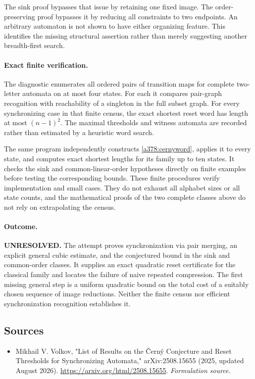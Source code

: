 \documentclass[11pt]{article}
\begin{document}
The sink proof bypasses that issue by retaining one fixed image. The order-preserving proof bypasses it by reducing all constraints to two endpoints. An arbitrary automaton is not shown to have either organizing feature. This identifies the missing structural assertion rather than merely suggesting another breadth-first search.

\paragraph{Exact finite verification.}
The diagnostic enumerates all ordered pairs of transition maps for complete two-letter automata on at most four states. For each it compares pair-graph recognition with reachability of a singleton in the full subset graph. For every synchronizing case in that finite census, the exact shortest reset word has length at most $(n-1)^2$. The maximal thresholds and witness automata are recorded rather than estimated by a heuristic word search.

The same program independently constructs \eqref{a378:cernyword}, applies it to every state, and computes exact shortest lengths for its family up to ten states. It checks the sink and common-linear-order hypotheses directly on finite examples before testing the corresponding bounds. These finite procedures verify implementation and small cases. They do not exhaust all alphabet sizes or all state counts, and the mathematical proofs of the two complete classes above do not rely on extrapolating the census.

\paragraph{Outcome.}
\textbf{UNRESOLVED.} The attempt proves synchronization via pair merging, an explicit general cubic estimate, and the conjectured bound in the sink and common-order classes. It supplies an exact quadratic reset certificate for the classical family and locates the failure of naive repeated compression. The first missing general step is a uniform quadratic bound on the total cost of a suitably chosen sequence of image reductions. Neither the finite census nor efficient synchronization recognition establishes it.

\subsection{Sources}
\begin{itemize}
\item[S1]Mikhail V. Volkov, "List of Results on the Černý Conjecture and Reset Thresholds for Synchronizing Automata," arXiv:2508.15655 (2025, updated August 2026).
\url{https://arxiv.org/html/2508.15655}.
\textit{Formulation source.}
\end{itemize}
\end{document}
